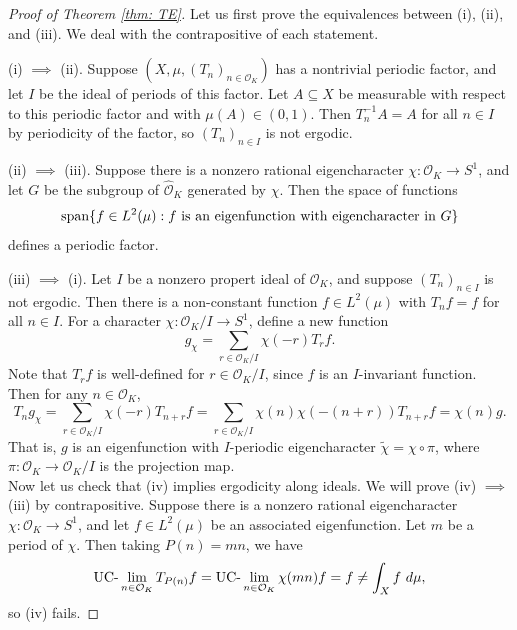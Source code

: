\documentclass{amsart}
\theoremstyle{definition}
\numberwithin{equation}{section}
\newcommand{\mO}{\mathcal{O}}
\renewcommand{\tilde}{\widetilde}
\renewcommand{\hat}{\widehat}
\newcommand{\UClim}{\textup{UC-}\lim}
\begin{document}
\begin{proof}[Proof of Theorem \ref{thm: TE}]
    Let us first prove the equivalences between (i), (ii), and (iii).
    We deal with the contrapositive of each statement.

    (i) $\implies$ (ii).
    Suppose $(X, \mu, (T_n)_{n \in \mO_K})$ has a nontrivial periodic factor, and let $I$ be the ideal of periods of this factor.
    Let $A \subseteq X$ be measurable with respect to this periodic factor and with $\mu(A) \in (0,1)$.
    Then $T_n^{-1}A = A$ for all $n \in I$ by periodicity of the factor, so $(T_n)_{n \in I}$ is not ergodic.

    (ii) $\implies$ (iii).
    Suppose there is a nonzero rational eigencharacter $\chi : \mO_K \to S^1$, and let $G$ be the subgroup of $\hat{\mO}_K$ generated by $\chi$.
    Then the space of functions
    \begin{equation*}
        \textup{span}\{f \in L^2(\mu) : f~\text{is an eigenfunction with eigencharacter in}~G\}
    \end{equation*}
    defines a periodic factor.

    (iii) $\implies$ (i).
    Let $I$ be a nonzero propert ideal of $\mO_K$, and suppose $(T_n)_{n \in I}$ is not ergodic.
    Then there is a non-constant function $f \in L^2(\mu)$ with $T_nf = f$ for all $n \in I$.
    For a character $\chi : \mO_K/I \to S^1$, define a new function
    \begin{equation*}
        g_{\chi} = \sum_{r \in \mO_K/I} \chi(-r) T_r f.
    \end{equation*}
    Note that $T_rf$ is well-defined for $r \in \mO_K/I$, since $f$ is an $I$-invariant function.
    Then for any $n \in \mO_K$,
    \begin{equation*}
        T_ng_{\chi} = \sum_{r \in \mO_K/I} \chi(-r) T_{n+r} f
         = \sum_{r \in \mO_K/I} \chi(n) \chi(-(n+r)) T_{n+r} f
         = \chi(n) g.
    \end{equation*}
    That is, $g$ is an eigenfunction with $I$-periodic eigencharacter $\tilde{\chi} = \chi \circ \pi$, where $\pi : \mO_K \to \mO_K/I$ is the projection map. \\

    Now let us check that (iv) implies ergodicity along ideals.
    We will prove (iv) $\implies$ (iii) by contrapositive.
    Suppose there is a nonzero rational eigencharacter $\chi : \mO_K \to S^1$, and let $f \in L^2(\mu)$ be an associated eigenfunction.
    Let $m$ be a period of $\chi$.
    Then taking $P(n) = mn$, we have
    \begin{equation*}
        \UClim_{n \in \mO_K} T_{P(n)}f = \UClim_{n \in \mO_K} \chi(mn)f = f \ne \int_X f~d\mu,
    \end{equation*}
    so (iv) fails.


\end{proof}
\end{document}
